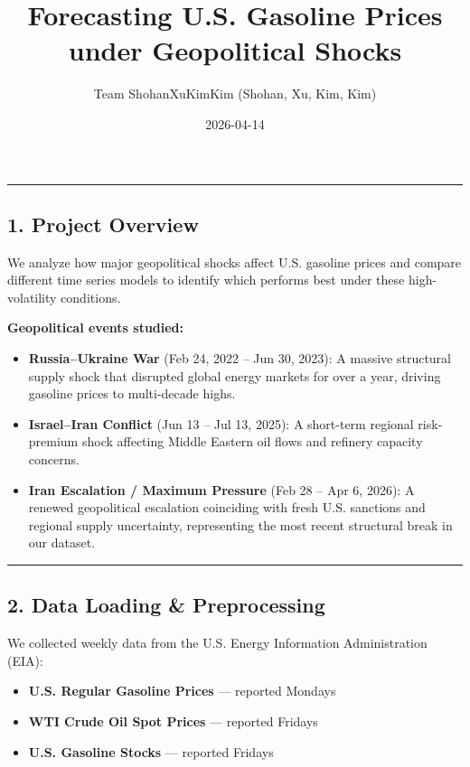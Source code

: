 \documentclass[
]{article}
\title{Forecasting U.S. Gasoline Prices under Geopolitical Shocks}
\author{Team ShohanXuKimKim (Shohan, Xu, Kim, Kim)}
\date{2026-04-14}
\providecommand{\tightlist}{%
  \setlength{\itemsep}{0pt}\setlength{\parskip}{0pt}}
\begin{document}
\maketitle

{
\setcounter{tocdepth}{3}
\tableofcontents
}
\begin{center}\rule{0.5\linewidth}{0.5pt}\end{center}

\subsection{1. Project Overview}\label{project-overview}

We analyze how major geopolitical shocks affect U.S. gasoline prices and
compare different time series models to identify which performs best
under these high-volatility conditions.

\textbf{Geopolitical events studied:}

\begin{itemize}
\tightlist
\item
  \textbf{Russia--Ukraine War} (Feb 24, 2022 -- Jun 30, 2023): A massive
  structural supply shock that disrupted global energy markets for over
  a year, driving gasoline prices to multi-decade highs.
\item
  \textbf{Israel--Iran Conflict} (Jun 13 -- Jul 13, 2025): A short-term
  regional risk-premium shock affecting Middle Eastern oil flows and
  refinery capacity concerns.
\item
  \textbf{Iran Escalation / Maximum Pressure} (Feb 28 -- Apr 6, 2026): A
  renewed geopolitical escalation coinciding with fresh U.S. sanctions
  and regional supply uncertainty, representing the most recent
  structural break in our dataset.
\end{itemize}

\begin{center}\rule{0.5\linewidth}{0.5pt}\end{center}

\subsection{2. Data Loading \&
Preprocessing}\label{data-loading-preprocessing}

We collected weekly data from the U.S. Energy Information Administration
(EIA):

\begin{itemize}
\tightlist
\item
  \textbf{U.S. Regular Gasoline Prices} --- reported Mondays
\item
  \textbf{WTI Crude Oil Spot Prices} --- reported Fridays
\item
  \textbf{U.S. Gasoline Stocks} --- reported Fridays
\end{itemize}
\end{document}
